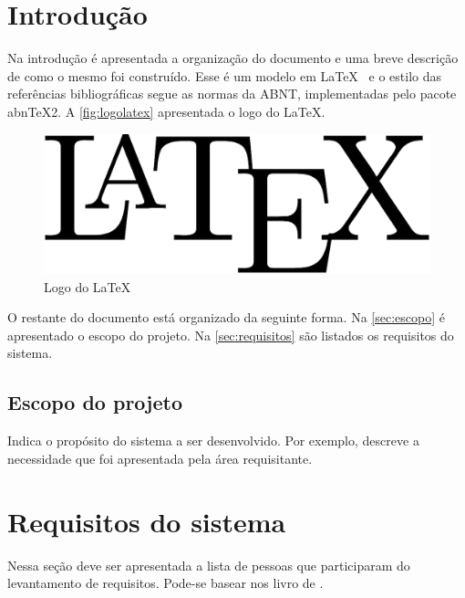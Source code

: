 \documentclass[11pt]{../../classes/univaliarticle}
\begin{document}
\tableofcontents
\clearpage


\section{Introdução}
\label{sec:introducao}

Na introdução é apresentada a organização do documento e uma breve descrição de como o mesmo foi construído.   Esse é um modelo em \LaTeX~ \cite{lamport94} e o estilo das referências bibliográficas segue as normas da ABNT, implementadas pelo pacote abnTeX2. A \autoref{fig:logolatex} apresentada o logo do \LaTeX.

\begin{figure}[ht]
    \centering
    \includegraphics[width=.5\linewidth]{figuras/latex-logo}
    \caption{Logo do \LaTeX}
    \label{fig:logolatex}
\end{figure}

\lipsum[1]

O restante do documento está organizado da seguinte forma. Na \autoref{sec:escopo} é apresentado o escopo do projeto. Na \autoref{sec:requisitos} são listados os requisitos do sistema.

\subsection{Escopo do projeto}
\label{sec:escopo}

Indica o propósito do sistema a ser desenvolvido. Por exemplo, descreve a necessidade que foi apresentada pela área requisitante. \lipsum[2]


\section{Requisitos do sistema}
\label{sec:requisitos}

Nessa seção deve ser apresentada a lista de pessoas que participaram do levantamento de requisitos. Pode-se basear nos livro de \cite{bezerra02}.
\end{document}
